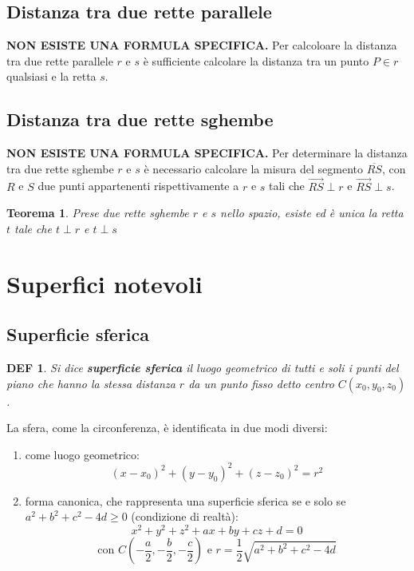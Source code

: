 \documentclass{article}     %
\newtheorem*{theorem}{Teorema}
\newtheorem*{definition}{DEF}
\begin{document}
        \subsection{Distanza tra due rette parallele}
            \textbf{NON ESISTE UNA FORMULA SPECIFICA.}
            Per calcoloare la distanza tra due rette parallele $r$ e $s$ è sufficiente calcolare la distanza tra un punto $P\in r$ qualsiasi e la retta $s$.
        \subsection{Distanza tra due rette sghembe}
            \textbf{NON ESISTE UNA FORMULA SPECIFICA.}
            Per determinare la distanza tra due rette sghembe $r$ e $s$ è necessario calcolare la misura del segmento $\overline{RS}$, con $R$ e $S$ due punti appartenenti rispettivamente a $r$ e $s$ tali che $\overrightarrow{RS}\perp r$ e $\overrightarrow{RS}\perp s$.
            \begin{theorem}
                Prese due rette sghembe $r$ e $s$ nello spazio, esiste ed è unica la retta $t$ tale che $t\perp r$ e $t\perp s$
            \end{theorem}
    \section{Superfici notevoli}
        \subsection{Superficie sferica}
            \begin{definition}
                Si dice \textbf{superficie sferica} il luogo geometrico di tutti e soli i punti del piano che hanno la stessa distanza $r$ da un punto fisso detto centro $C(x_0,y_0,z_0)$.
            \end{definition}
            La sfera, come la circonferenza, è identificata in due modi diversi:
            \begin{enumerate}
                \item come luogo geometrico:
                    \[(x-x_0)^2+(y-y_0)^2+(z-z_0)^2=r^2\]
                \item forma canonica, che rappresenta una superficie sferica se e solo se $a^2+b^2+c^2-4d\geq 0$ (condizione di realtà):
                    \[x^2+y^2+z^2+ax+by+cz+d=0\] \[\text{con } C(-\frac{a}{2},-\frac{b}{2},-\frac{c}{2}) \text{ e } r=\frac{1}{2}\sqrt{a^2+b^2+c^2-4d}\]
            \end{enumerate}
\end{document}
